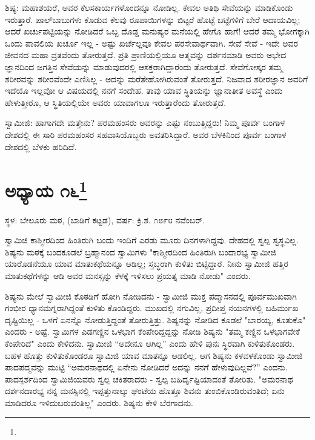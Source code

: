 ಶಿಷ್ಯ: ಮಹಾಶಯರೆ, ಅವರ ಕೆಲಸಕಾರ್ಯಗಳೊಂದನ್ನೂ ನೋಡಿಲ್ಲ. ಕೇವಲ ಅತಿಥಿ ಸೇವೆಯನ್ನು ಮಾಡಿಕೊಂಡು ಇರುತ್ತಾರೆ. ಪಾಲ್‌ಬಾಬುಗಳು ಕೊಡುವ ಕೆಲವು ರೂಪಾಯಿಗಳನ್ನು ಬಿಟ್ಟರೆ ಹೊಟ್ಟೆ ಬಟ್ಟೆಗಳಿಗೆ ಬೇರೆ ಆದಾಯವಿಲ್ಲ; ಆದರೆ ಖರ್ಚುಪಟ್ಟಿಯನ್ನು ನೋಡಿದರೆ ಒಬ್ಬ ದೊಡ್ಡ ಮನುಷ್ಯರ ಮನೆಯಲ್ಲಿ ಹೇಗೊ ಹಾಗೆ! ಆದರೆ ತಮ್ಮ ಭೋಗಕ್ಕಾಗಿ ಒಂದು ಪಾವಲಿಯ ಖರ್ಚೂ ಇಲ್ಲ - ಅಷ್ಟು ಖರ್ಚೆಲ್ಲವೂ ಕೇವಲ ಪರಸೇವಾರ್ಥವಾಗಿ. ಸೇವೆ ಸೇವೆ - ಇದೇ ಅವರ ಜೀವನದ ಮಹಾ ವ್ರತವೆಂದು ತೋರುತ್ತದೆ. ಪ್ರತಿ ಪ್ರಾಣಿಯಲ್ಲಿಯೂ ಆತ್ಮವನ್ನು ದರ್ಶನಮಾಡಿ ಅವರು ಅಭೇದ ಜ್ಞಾನದಿಂದ ಜಗತ್ತಿನ ಸೇವೆಯನ್ನು ಮಾಡುವುದರಲ್ಲಿ ಆಸಕ್ತರಾಗಿದ್ದಾರೆಂದು ತೋರುತ್ತದೆ. ಸೇವೆಗೋಸ್ಕರ ತಮ್ಮ ಶರೀರವನ್ನು ಶರೀರವೆಂದೇ ಎಣಿಸಿಲ್ಲ - ಅದನ್ನು ಮರೆತೇಹೋಗಿರುವಂತೆ ತೋರುತ್ತದೆ. ನಿಜವಾದ ಶರೀರಜ್ಞಾನ ಅವರಿಗೆ ಇದೆಯೊ ಇಲ್ಲವೋ ಆ ವಿಷಯದಲ್ಲಿ ನನಗೆ ಸಂದೇಹ. ತಾವು ಯಾವ ಸ್ಥಿತಿಯನ್ನು ಜ್ಞಾನಾತೀತ ಅವಸ್ಥೆ ಎಂದು ಹೇಳುತ್ತೀರೊ, ಆ ಸ್ಥಿತಿಯಲ್ಲಿಯೇ ಅವರು ಯಾವಾಗಲೂ ಇರುತ್ತಾರೆಂದು ತೋರುತ್ತದೆ.

ಸ್ವಾಮೀಜಿ: ಹಾಗಾಗದೇ ಮತ್ತೇನು? ಪರಮಹಂಸರು ಅವರನ್ನು ಎಷ್ಟು ನಂಬುತ್ತಿದ್ದರು! ನಿಮ್ಮ ಪೂರ್ವ ಬಂಗಾಳ ದೇಶದಲ್ಲಿ ಈ ಸಾರಿ ಪರಮಹಂಸರ ಸಹವಾಸಿಯೊಬ್ಬರು ಅವತರಿಸಿದ್ದಾರೆ. ಅವರ ಬೆಳಕಿನಿಂದ ಪೂರ್ವ ಬಂಗಾಳ ದೇಶದಲ್ಲಿ ಬೆಳಕು ಹರಿದಿದೆ.

\chapter[ಅಧ್ಯಾಯ ೧೬]{ಅಧ್ಯಾಯ ೧೬\protect\footnote{}}

\begin{center}
ಸ್ಥಳ: ಬೇಲೂರು ಮಠ, (ಬಾಡಿಗೆ ಕಟ್ಟಡ), ವರ್ಷ: ಕ್ರಿ.ಶ. ೧೮೯೮ ನವೆಂಬರ್.
\end{center}

ಸ್ವಾಮಿಜಿ ಕಾಶ್ಮೀರದಿಂದ ಹಿಂತಿರುಗಿ ಬಂದು ಇಂದಿಗೆ ಎರಡು ಮೂರು ದಿನಗಳಾಗಿದ್ದವು. ದೇಹದಲ್ಲಿ ಸ್ವಲ್ಪ ಸ್ವಸ್ಥವಿಲ್ಲ. ಶಿಷ್ಯನು ಮಠಕ್ಕೆ ಬಂದಕೂಡಲೆ ಬ್ರಹ್ಮಾನಂದ ಸ್ವಾಮಿಗಳು "ಕಾಶ್ಮೀರದಿಂದ ಹಿಂತಿರುಗಿ ಬಂದಾರಭ್ಯ ಸ್ವಾಮೀಜಿ ಯಾರೊಡನೆಯೂ ಯಾವ ಮಾತುಕಥೆಯನ್ನೂ ಆಡಿಲ್ಲ; ಸ್ತಬ್ಧರಾಗಿ ಕುಳಿತು ಬಿಟ್ಟಿದ್ದಾರೆ. ನೀನು ಸ್ವಾಮೀಜಿ ಹತ್ತಿರ ಮಾತುಕಥೆಗಳನ್ನು ಆಡಿ ಅವರ ಮನಸ್ಸನ್ನು ಕೆಳಕ್ಕೆ ಇಳಿಸಲು ಪ್ರಯತ್ನ ಮಾಡಿ ನೋಡು" ಎಂದರು.

ಶಿಷ್ಯನು ಮೇಲೆ ಸ್ವಾಮೀಜಿ ಕೊಠಡಿಗೆ ಹೋಗಿ ನೋಡಿದನು - ಸ್ವಾಮೀಜಿ ಮುಕ್ತ ಪದ್ಮಾಸನದಲ್ಲಿ ಪೂರ್ವಮುಖವಾಗಿ ಗಂಭೀರ ಧ್ಯಾನಮಗ್ನರಾಗಿದ್ದಂತೆ ಕುಳಿತು ಕೊಂಡಿದ್ದರು. ಮುಖದಲ್ಲಿ ನಗುವಿಲ್ಲ, ಪ್ರದೀಪ್ತ ನಯನಗಳಲ್ಲಿ ಬಹಿರ್ಮುಖ ದೃಷ್ಟಿಯಿಲ್ಲ - ಒಳಗೆ ಏನನ್ನೊ ನೋಡುತ್ತಿದ್ದಂತೆ ತೋರುತ್ತಿತ್ತು. ಶಿಷ್ಯನನ್ನು ನೋಡಿದ ಕೂಡಲೆ "ಬಾರಯ್ಯ, ಕೂತುಕೊ" ಎಂದರು - ಅಷ್ಟೆ. ಸ್ವಾಮಿಗಳ ಎಡಗಣ್ಣಿನ ಒಳಭಾಗ ಕೆಂಪೇರಿದ್ದದ್ದನ್ನು ನೋಡಿ ಶಿಷ್ಯನು "ತಮ್ಮ ಕಣ್ಣಿನ ಒಳಭಾಗವೇಕೆ ಕೆಂಪೇರಿದೆ" ಎಂದು ಕೇಳಿದನು. ಸ್ವಾಮೀಜಿ “ಅದೇನೂ ಆಗಿಲ್ಲ” ಎಂದು ಹೇಳಿ ಪುನಃ ಸ್ಥಿರವಾಗಿ ಕುಳಿತುಕೊಂಡರು. ಬಹಳ ಹೊತ್ತು ಕುಳಿತುಕೊಂಡರೂ ಸ್ವಾಮಿಜಿ ಯಾವ ಮಾತನ್ನೂ ಆಡಲಿಲ್ಲ. ಆಗ ಶಿಷ್ಯನು ಕಳವಳಕೊಂಡು ಸ್ವಾಮೀಜಿ ಪಾದಪದ್ಮವನ್ನು ಮುಟ್ಟಿ “ಅಮರನಾಥದಲ್ಲಿ ಏನೇನು ನೋಡಿದರೆ ಅದನ್ನು ನನಗೆ ಹೇಳುವುದಿಲ್ಲವೆ?” ಎಂದನು. ಪಾದಸ್ಪರ್ಶದಿಂದ ಸ್ವಾಮಿಜಿಯವರು ಸ್ವಲ್ಪ ಚಕಿತರಾದರು - ಸ್ವಲ್ಪ ಬಹಿರ್ದೃಷ್ಟಿಯಾದಂತೆ ತೋರಿತು. "ಅಮರನಾಥ ದರ್ಶನದಾರಭ್ಯ ನನ್ನ ಮನಸ್ಸಿನಲ್ಲಿ ಇಪ್ಪತ್ತುನಾಲ್ಕು ಘಂಟೆಯ ಹೊತ್ತೂ ಶಿವನು ತುಂಬಿಕೊಂಡಿರುವಂತಿದೆ; ಏನು ಮಾಡಿದರೂ ಇಳಿದುಬರುವಂತಿಲ್ಲ" ಎಂದರು. ಶಿಷ್ಯನು ಕೇಳಿ ಬೆರಗಾದನು.

